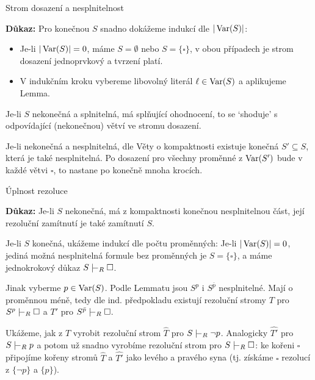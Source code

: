 \documentclass{beamer}
\begin{document}
\begin{frame}{Strom dosazení a nesplnitelnost}
    

    \textbf{Důkaz:} 
        Pro \alert{konečnou} $S$ snadno dokážeme indukcí dle $|\operatorname{Var}(S)|$: 
        \begin{itemize}
            \item Je-li $|\operatorname{Var}(S)|=0$, máme $S=\emptyset$ nebo $S=\{\square\}$, v obou případech je strom dosazení jednoprvkový a tvrzení platí. 
            \item V indukčním kroku vybereme libovolný literál $\ell\in\operatorname{Var}(S)$ a aplikujeme Lemma.
        \end{itemize} 
    Je-li $S$ \alert{nekonečná a splnitelná}, má splňující ohodnocení, to se `shoduje' s odpovídající (nekonečnou) větví ve stromu dosazení. 
    
    Je-li \alert{nekonečná a nesplnitelná}, dle Věty o kompaktnosti existuje konečná $S'\subseteq S$, která je také nesplnitelná. Po dosazení pro všechny proměnné z $\operatorname{Var}(S')$ bude v každé větvi $\square$, to nastane po konečně mnoha krocích.
    \hfill\qedsymbol

\end{frame}


\begin{frame}{Úplnost rezoluce}


    \textbf{Důkaz:} \alert{Je-li $S$ nekonečná}, má z kompaktnosti konečnou nesplnitelnou část, její rezoluční zamítnutí je také zamítnutí $S$. 
    
    \alert{Je-li $S$ konečná}, ukážeme indukcí dle počtu proměnných: Je-li $|\operatorname{Var}(S)|=0$, jediná možná nesplnitelná formule bez proměnných je $S=\{\square\}$, a máme jednokrokový důkaz $S\proves_R\square$. 
    
    Jinak vyberme $p\in\operatorname{Var}(S)$. Podle Lemmatu jsou $S^p$ i $S^{\bar p}$ nesplnitelné. Mají o proměnnou méně, tedy dle ind. předpokladu existují rezoluční stromy $T$ pro $S^p\proves_R\square$ a $T'$ pro $S^{\bar p}\proves_R\square$.

    Ukážeme, jak z $T$ vyrobit rezoluční strom $\widehat T$ pro $S\proves_R \neg p$. Analogicky $\widehat{T'}$ pro $S\proves_R p$ a potom už snadno vyrobíme rezoluční strom pro $S\proves_R\square$: ke kořeni $\square$ připojíme kořeny stromů $\widehat T$ a $\widehat{T'}$ jako levého a pravého syna (tj. získáme $\square$ rezolucí z $\{\neg p\}$ a $\{p\}$).

\end{frame}
\end{document}
